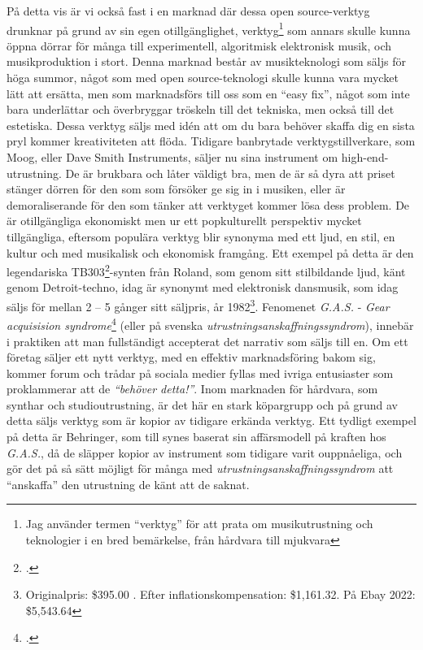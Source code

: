 \documentclass{article}
\begin{document}
På detta vis är vi också fast i en marknad där dessa open source-verktyg drunknar på grund av sin egen
otillgänglighet, verktyg\footnote{Jag använder termen ``verktyg'' för att prata om musikutrustning och
teknologier i en bred bemärkelse, från hårdvara till mjukvara} som annars skulle kunna öppna dörrar för många
till experimentell, algoritmisk elektronisk musik, och musikproduktion i stort. Denna marknad består av
musikteknologi som säljs för höga summor, något som med open source-teknologi skulle kunna vara mycket lätt
att ersätta, men som marknadsförs till oss som en ``easy fix'', något som inte bara underlättar och överbryggar
tröskeln till det tekniska, men också till det estetiska. Dessa verktyg säljs med idén att om du bara behöver
skaffa dig en sista pryl kommer kreativiteten att flöda. Tidigare banbrytade verktygstillverkare, som
Moog, eller Dave Smith Instruments, säljer nu sina instrument om high-end-utrustning. De är brukbara och låter
väldigt bra, men de är så dyra att priset stänger dörren för den som som försöker ge sig in i musiken, eller
är demoraliserande för den som tänker att verktyget kommer lösa dess problem. De är otillgängliga ekonomiskt
men ur ett popkulturellt perspektiv mycket tillgängliga, eftersom populära verktyg blir synonyma med ett ljud,
en stil, en kultur och med musikalisk och ekonomisk framgång. Ett exempel på detta är den legendariska
TB303\footcite{303}-synten från Roland, som genom sitt
stilbildande ljud, känt genom Detroit-techno, idag är synonymt med elektronisk dansmusik, som idag säljs för
mellan 2 -- 5 gånger sitt säljpris, år 1982\footnote{Originalpris: \$395.00 . Efter inflationskompensation:
\$1,161.32. På Ebay 2022: \$5,543.64}. Fenomenet \emph{G.A.S.} - \emph{Gear acquisision syndrome}\footcite{gas}
(eller på svenska \emph{utrustningsanskaffningssyndrom}), innebär i praktiken att man fullständigt
accepterat det narrativ som säljs till en. Om ett företag säljer ett nytt verktyg, med en effektiv
marknadsföring bakom sig, kommer forum och trådar på sociala medier fyllas med ivriga entusiaster som
proklammerar att de \emph{``behöver detta!''}. Inom marknaden för hårdvara, som synthar och studioutrustning,
är det här en stark köpargrupp och på grund av detta säljs
verktyg som är kopior av tidigare erkända verktyg. Ett tydligt exempel på detta är Behringer, som till synes
baserat sin affärsmodell på kraften hos \emph{G.A.S.}, då de släpper kopior av instrument som tidigare varit
ouppnåeliga, och gör det på så sätt möjligt för många med \emph{utrustningsanskaffningssyndrom} att
``anskaffa'' den utrustning de känt att de saknat.
\end{document}
